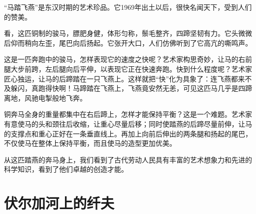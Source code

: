 \documentclass[12pt,UTF-8,openany]{ctexbook}
\begin{document}
\begin{large}
    
    “马踏飞燕”是东汉时期的艺术珍品。它1969年出土以后，很快名闻天下，受到人们的赞美。
    
    看，这匹铜制的骏马，膘肥身健，体形匀称，鬃毛整齐，四蹄坚韧有力。它头微微后仰而稍向左歪，尾巴向后扬起。它张开大口，人们仿佛听到了它高亢的嘶鸣声。
    
    这是一匹奔跑中的骏马，怎样表现它的速度之快呢？艺术家构思奇妙，让马的右前腿大步前跨，左后腿向后平伸，以表现它正在快速奔跑。快到什么程度呢？艺术家匠心独运，让马的后蹄踏在一只飞燕上。这样就把“快”化为具象了：连飞燕都来不及躲闪，真跑得快啊！马蹄踏在飞燕上，飞燕竟安然无恙，可见这匹马几乎是四蹄离地，风驰电掣般地飞奔。
    
    铜奔马全身的重量都集中在右后蹄上，怎样才能保持平衡？这是一个难题。艺术家有意使马的头和颈往后收缩，让重心尽量后移；同时使踏燕的后蹄尽量前伸，让马的支撑点和重心正好在一条垂直线上。再加上向前后伸出的两条腿和扬起的尾巴，不仅使马在整体上保持平衡，而且使马的造型更加优美。
    
    从这匹踏燕的奔马身上，我们看到了古代劳动人民具有丰富的艺术想象力和先进的科学知识，看到了他们卓越的创造才能。
    
\end{large}



\chapter{伏尔加河上的纤夫}
\end{document}

